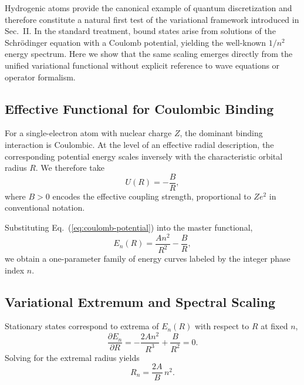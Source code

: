 \documentclass[11pt]{article}
\begin{document}
        Hydrogenic atoms provide the canonical example of quantum discretization and therefore constitute a natural first test of the variational framework introduced in Sec.~II. In the standard treatment, bound states arise from solutions of the Schr\"odinger equation with a Coulomb potential, yielding the well-known $1/n^2$ energy spectrum. Here we show that the same scaling emerges directly from the unified variational functional without explicit reference to wave equations or operator formalism.

        \subsection{Effective Functional for Coulombic Binding}

            For a single-electron atom with nuclear charge $Z$, the dominant binding interaction is Coulombic. At the level of an effective radial description, the corresponding potential energy scales inversely with the characteristic orbital radius $R$. We therefore take
            \begin{equation}
                U(R) = -\frac{B}{R},
                \label{eq:coulomb-potential}
            \end{equation}
            where $B>0$ encodes the effective coupling strength, proportional to $Z e^2$ in conventional notation.

            Substituting Eq.~(\ref{eq:coulomb-potential}) into the master functional,
            \begin{equation}
                E_n(R)=\frac{A n^2}{R^2}-\frac{B}{R},
                \label{eq:hydrogen-functional}
            \end{equation}
            we obtain a one-parameter family of energy curves labeled by the integer phase index $n$.

        \subsection{Variational Extremum and Spectral Scaling}

            Stationary states correspond to extrema of $E_n(R)$ with respect to $R$ at fixed $n$,
            \begin{equation}
                \frac{\partial E_n}{\partial R}
                = -\frac{2A n^2}{R^3}+\frac{B}{R^2}=0.
            \end{equation}
            Solving for the extremal radius yields
            \begin{equation}
                R_n = \frac{2A}{B}\,n^2.
                \label{eq:rydberg-radius}
            \end{equation}
\end{document}
